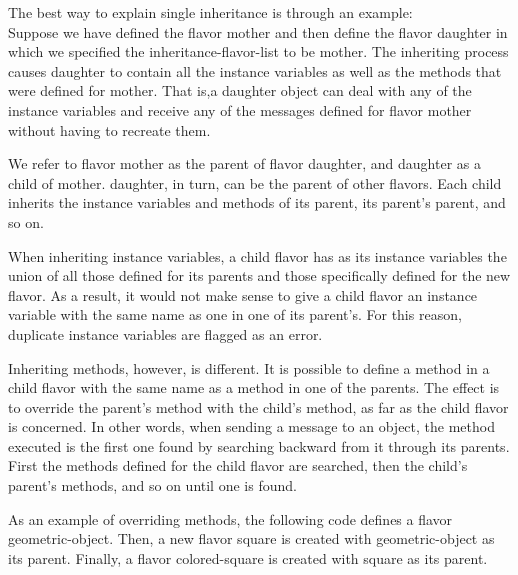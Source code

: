   The best way to explain single inheritance is through an example:\\
Suppose we have defined the flavor mother and then define the flavor daughter in
which we specified the inheritance-flavor-list to be mother. The inheriting
process causes daughter to contain all the instance variables as well as
the methods that were defined for mother. That is,a daughter object can
deal with any of the instance variables and receive any of the messages
defined for flavor mother without having to recreate them.

We refer to flavor mother as the parent of flavor daughter,  and
daughter  as  a  child of mother.  daughter, in turn, can be the
parent of other flavors.    Each  child  inherits  the  instance
variables and methods of its parent, its parent's parent, and so
on.

  When  inheriting instance variables, a child flavor has as its
instance variables the  union  of  all  those  defined  for  its
parents and those specifically defined for the new flavor.  As a
result,  it  would  not  make  sense  to  give a child flavor an
instance variable with the same  name  as  one  in  one  of  its
parent's.   For  this  reason,  duplicate instance variables are
flagged as an error.

  Inheriting methods, however, is different.  It is possible  to
define a method in a child flavor with the same name as a method
in  one  of the parents.  The effect is to override the parent's
method with the child's method, as far as the  child  flavor  is
concerned.  In other words, when sending a message to an object,
the method executed is the first one found by searching backward
from  it through its parents.  First the methods defined for the
child flavor are searched, then the  child's  parent's  methods,
and so on until one is found.

  As  an  example  of  overriding  methods,  the  following code
defines a flavor geometric-object.  Then, a new flavor square is
created with geometric-object as its parent.  Finally, a  flavor
colored-square is created with square as its parent.

